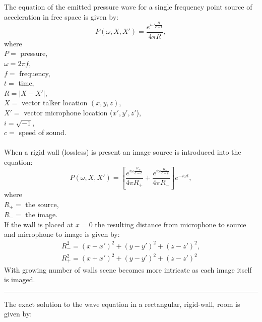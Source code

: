 The equation of the emitted pressure wave for a single frequency point source of acceleration in free space is given by:
\begin{equation}
    P(\omega ,X,X') = \frac{e^{i\omega\frac{R}{c-t}}}{4\pi R},
\end{equation}
where\\
$P=$ pressure,\\
$\omega= 2\pi f$,\\
$f=$ frequency,\\
$t=$ time,\\
$R= |X-X'|$,\\
$X=$ vector talker location $(x,y,z)$,\\
$X'=$ vector microphone location ($x',y',z'$),\\
$i=\sqrt{-1}$,\\
$c=$ speed of sound.
\\
\\
When a rigid wall (lossless) is present an image source is introduced into the equation:
\begin{equation}
    P(\omega ,X,X') = [\frac{e^{i\omega\frac{R_+}{c-t}}}{4\pi R_+} + \frac{e^{i\omega\frac{R_-}{c-t}}}{4\pi R_-}]e^{-i\omega t},
\end{equation}
where\\
$R_+=$ the source,\\
$R_-=$ the image.\\
If the wall is placed at $x=0$ the resulting distance from microphone to source and microphone to image is given by:
\begin{equation}
\begin{gathered}
     R_-^2 = (x-x')^2+(y-y')^2+(z-z')^2,\\
    R_+^2 = (x+x')^2+(y-y')^2+(z-z')^2
\end{gathered}
\end{equation}
With growing number of walls scene becomes more intricate as each image itself is imaged.\cite{Allen1979}
\\
\rule{\textwidth}{0.4pt}
The exact solution to the wave equation in a rectangular, rigid-wall, room is given by:


\begin{equation}
    
\end{equation}